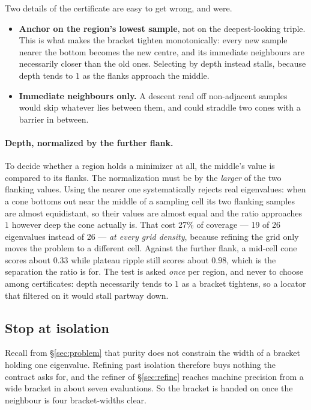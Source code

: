 \documentclass[11pt]{article}
\theoremstyle{definition}
\theoremstyle{remark}
\begin{document}
Two details of the certificate are easy to get wrong, and were.

\begin{itemize}
\item \textbf{Anchor on the region's lowest sample}, not on the deepest-looking triple. This is
what makes the bracket tighten monotonically: every new sample nearer the bottom becomes the
new centre, and its immediate neighbours are necessarily closer than the old ones. Selecting by
depth instead stalls, because depth tends to $1$ as the flanks approach the middle.
\item \textbf{Immediate neighbours only.} A descent read off non-adjacent samples would skip
whatever lies between them, and could straddle two cones with a barrier in between.
\end{itemize}

\paragraph{Depth, normalized by the further flank.} To decide whether a region holds a
minimizer at all, the middle's value is compared to its flanks. The normalization must be by
the \emph{larger} of the two flanking values. Using the nearer one systematically rejects real
eigenvalues: when a cone bottoms out near the middle of a sampling cell its two flanking
samples are almost equidistant, so their values are almost equal and the ratio approaches $1$
however deep the cone actually is. That cost 27\% of coverage --- 19 of 26 eigenvalues instead
of 26 --- \emph{at every grid density}, because refining the grid only moves the problem to a
different cell. Against the further flank, a mid-cell cone scores about $0.33$ while plateau
ripple still scores about $0.98$, which is the separation the ratio is for. The test is asked
\emph{once} per region, and never to choose among certificates: depth necessarily tends to $1$
as a bracket tightens, so a locator that filtered on it would stall partway down.

\subsection{Stop at isolation}

Recall from \S\ref{sec:problem} that purity does not constrain the width of a bracket holding
one eigenvalue. Refining past isolation therefore buys nothing the contract asks for, and the
refiner of \S\ref{sec:refine} reaches machine precision from a wide bracket in about seven
evaluations. So the bracket is handed on once the neighbour is four bracket-widths clear.
\end{document}
